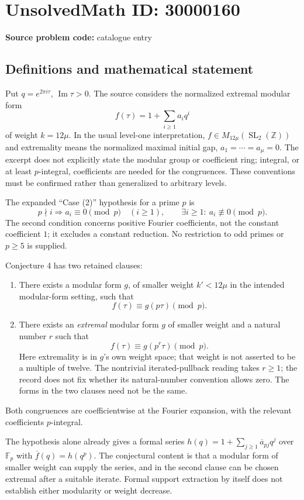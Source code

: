 \documentclass[11pt]{article}
\newcommand{\Z}{\mathbb{Z}}
\newcommand{\F}{\mathbb{F}}
\begin{document}
\section*{UnsolvedMath ID: 30000160}
\textbf{Source problem code:} catalogue entry
\subsection{Definitions and mathematical statement}
Put \(q=e^{2\pi i\tau}\), \(\operatorname{Im}\tau>0\). The source considers the normalized extremal modular form
\[
 f(\tau)=1+\sum_{i\geq1}a_iq^i
\]
of weight \(k=12\mu\). In the usual level-one interpretation, \(f\in M_{12\mu}(\operatorname{SL}_2(\Z))\) and extremality means the normalized maximal initial gap, \(a_1=\cdots=a_\mu=0\). The excerpt does not explicitly state the modular group or coefficient ring; integral, or at least \(p\)-integral, coefficients are needed for the congruences. These conventions must be confirmed rather than generalized to arbitrary levels.

The expanded ``Case (2)'' hypothesis for a prime \(p\) is
\[
 p\nmid i\Longrightarrow a_i\equiv0\pmod p\quad(i\geq1),
 \qquad\exists i\geq1:\ a_i\not\equiv0\pmod p.
\]
The second condition concerns positive Fourier coefficients, not the constant coefficient \(1\); it excludes a constant reduction. No restriction to odd primes or \(p\geq5\) is supplied.

Conjecture 4 has two retained clauses:
\begin{enumerate}
\item There exists a modular form \(g\), of smaller weight \(k'<12\mu\) in the intended modular-form setting, such that
\[
 f(\tau)\equiv g(p\tau)\pmod p.
\]
\item There exists an \emph{extremal} modular form \(g\) of smaller weight and a natural number \(r\) such that
\[
 f(\tau)\equiv g(p^r\tau)\pmod p.
\]
Here extremality is in \(g\)'s own weight space; that weight is not asserted to be a multiple of twelve. The nontrivial iterated-pullback reading takes \(r\geq1\); the record does not fix whether its natural-number convention allows zero. The forms in the two clauses need not be the same.
\end{enumerate}
Both congruences are coefficientwise at the Fourier expansion, with the relevant coefficients \(p\)-integral.

The hypothesis alone already gives a formal series \(h(q)=1+\sum_{j\geq1}\overline a_{pj}q^j\) over \(\F_p\) with \(\overline f(q)=h(q^p)\). The conjectural content is that a modular form of smaller weight can supply the series, and in the second clause can be chosen extremal after a suitable iterate. Formal support extraction by itself does not establish either modularity or weight decrease.
\end{document}
